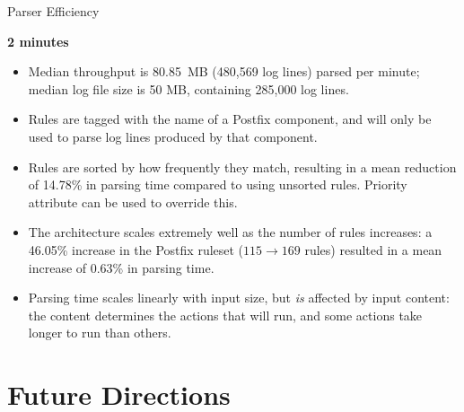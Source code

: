 \documentclass{beamer}
\newcommand{\timingnote}[1]{%
    \textbf{#1}%
}
\begin{document}
\begin{frame}{Parser Efficiency}

    \timingnote{2 minutes}

    \begin{itemize}

        \item Median throughput is 80.85~MB (480,569 log lines) parsed per
            minute; median log file size is 50 MB, containing 285,000 log
            lines.

        \item Rules are tagged with the name of a Postfix component, and
            will only be used to parse log lines produced by that
            component.

        \item Rules are sorted by how frequently they match, resulting in a
            mean reduction of 14.78\% in parsing time compared to using
            unsorted rules.  Priority attribute can be used to override
            this.

        \item The architecture scales extremely well as the number of rules
            increases: a 46.05\% increase in the Postfix ruleset ($115
            \rightarrow{} 169$ rules) resulted in a mean increase of 0.63\%
            in parsing time.

        \item Parsing time scales linearly with input size, but
            \textit{is\/} affected by input content: the content determines
            the actions that will run, and some actions take longer to run
            than others.

    \end{itemize}

\end{frame}

\section{Future Directions}
\end{document}
